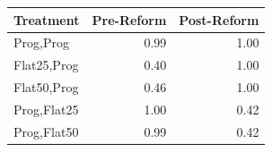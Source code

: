 \begin{tabular}{lrr}
\toprule
Treatment & Pre-Reform & Post-Reform \\
\midrule
Prog,Prog & 0.99 & 1.00 \\
Flat25,Prog & 0.40 & 1.00 \\
Flat50,Prog & 0.46 & 1.00 \\
Prog,Flat25 & 1.00 & 0.42 \\
Prog,Flat50 & 0.99 & 0.42 \\
\bottomrule
\end{tabular}
